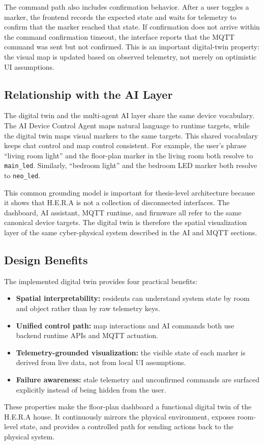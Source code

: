 The command path also includes confirmation behavior. After a user toggles a marker, the frontend records the expected state and waits for telemetry to confirm that the marker reached that state. If confirmation does not arrive within the command confirmation timeout, the interface reports that the MQTT command was sent but not confirmed. This is an important digital-twin property: the visual map is updated based on observed telemetry, not merely on optimistic UI assumptions.

\subsection{Relationship with the AI Layer}

The digital twin and the multi-agent AI layer share the same device vocabulary. The AI Device Control Agent maps natural language to runtime targets, while the digital twin maps visual markers to the same targets. This shared vocabulary keeps chat control and map control consistent. For example, the user's phrase ``living room light'' and the floor-plan marker in the living room both resolve to \texttt{main\_led}. Similarly, ``bedroom light'' and the bedroom LED marker both resolve to \texttt{neo\_led}.

This common grounding model is important for thesis-level architecture because it shows that H.E.R.A is not a collection of disconnected interfaces. The dashboard, AI assistant, MQTT runtime, and firmware all refer to the same canonical device targets. The digital twin is therefore the spatial visualization layer of the same cyber-physical system described in the AI and MQTT sections.

\subsection{Design Benefits}

The implemented digital twin provides four practical benefits:

\begin{itemize}[leftmargin=*, itemsep=2pt]
    \item \textbf{Spatial interpretability:} residents can understand system state by room and object rather than by raw telemetry keys.
    \item \textbf{Unified control path:} map interactions and AI commands both use backend runtime APIs and MQTT actuation.
    \item \textbf{Telemetry-grounded visualization:} the visible state of each marker is derived from live data, not from local UI assumptions.
    \item \textbf{Failure awareness:} stale telemetry and unconfirmed commands are surfaced explicitly instead of being hidden from the user.
\end{itemize}

These properties make the floor-plan dashboard a functional digital twin of the H.E.R.A house. It continuously mirrors the physical environment, exposes room-level state, and provides a controlled path for sending actions back to the physical system.

